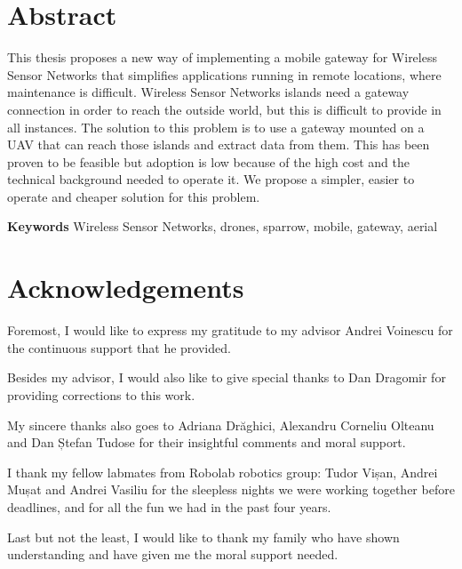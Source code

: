 \chapter*{Abstract}

This thesis proposes a new way of implementing a mobile gateway for Wireless Sensor Networks that simplifies applications running in remote locations, where maintenance is difficult. Wireless Sensor Networks islands need a gateway connection in order to reach the outside world, but this is difficult to provide in all instances.  The solution to this problem is to use a gateway mounted on a UAV that can reach those islands and extract data from them. This has been proven to be feasible but adoption is low because of the high cost and the technical background needed to operate it. We propose a simpler, easier to operate and cheaper solution for this problem.


 

\textbf{Keywords} Wireless Sensor Networks, drones, sparrow, mobile, gateway, aerial

\chapter*{Acknowledgements}

Foremost, I would like to express my gratitude to my advisor Andrei Voinescu for the continuous support that he provided.

Besides my advisor, I would also like to give special thanks to Dan Dragomir for providing corrections to this work. 
  
My sincere thanks also goes to Adriana Drăghici, Alexandru Corneliu Olteanu and Dan Ștefan Tudose for their insightful comments  and moral support.

I thank my fellow labmates from Robolab robotics group: Tudor Vișan, Andrei Mușat and Andrei Vasiliu for the sleepless nights we were working together before deadlines, and for all the fun we had in the past four years.

Last but not the least, I would like to thank my family who have shown understanding and have given me the moral support needed.

